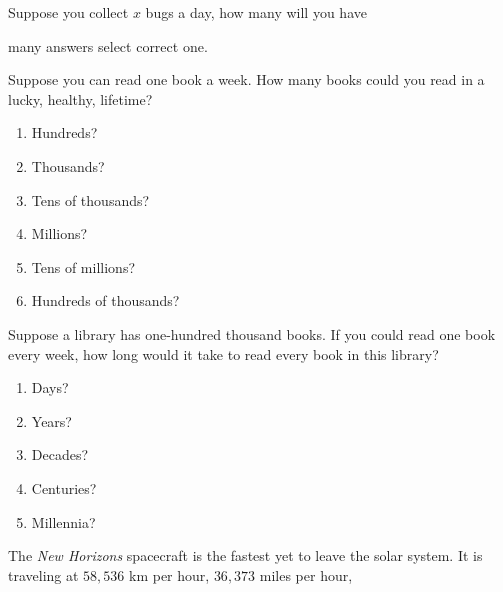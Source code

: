 \documentclass{ximera}
\author{Bart Snapp}
\begin{document}
\maketitle


\begin{exercise}
  Suppose you collect $x$ bugs a day, how many will you have

  many answers select correct one.
\end{exercise}
\vfill

\begin{exercise}
  Suppose you can read one book a week. How many books could you read
  in a lucky, healthy, lifetime?
  \begin{enumerate}
  \item Hundreds?
  \item Thousands?
  \item Tens of thousands?
  \item Millions?
  \item Tens of millions?
  \item Hundreds of thousands?
  \end{enumerate}
\end{exercise}
\vfill


\begin{exercise}
  Suppose a library has one-hundred thousand books.  If you could read
  one book every week, how long would it take to read every book in
  this library?
  \begin{enumerate}
  \item Days?
  \item Years?
  \item Decades?
  \item Centuries?
  \item Millennia?
 \end{enumerate}
\end{exercise}
\vfill


\begin{exercise}
  The \textit{New Horizons} spacecraft is the fastest yet to leave the
  solar system. It is traveling at $58,536$ km per hour, $36,373$
  miles per hour,
\end{exercise}
\vfill

\begin{exercise}
  
\end{exercise}
\vfill

\end{document}
